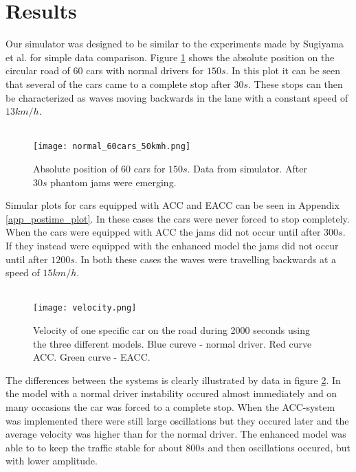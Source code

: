 \section{Results}
Our simulator was designed to be similar to the experiments made by Sugiyama
et al.\cite{sugiyama} for simple data comparison. Figure \ref{normal_postime}
shows the absolute position on the circular road of 60 cars with
normal drivers for $ 150 \unit{s} $. In this plot it can be seen that several
of the cars came to a complete stop after $ 30 \unit{s} $. These stops can
then be characterized as waves \cite{mit} moving backwards in the
lane with a constant speed of $ 13 \unit{km/h} $.\\\\

\begin{figure}[H]
    \begin{center}
    \texttt{[image: normal\_60cars\_50kmh.png]}
    \caption{\label{normal_postime}
Absolute position of 60 cars for $ 150 \unit{s} $. Data from simulator. After
$ 30 \unit{s} $ phantom jams were emerging.}
    \end{center}
\end{figure}

Simular plots for cars equipped with ACC and EACC can be seen in
Appendix \ref{app_postime_plot}. In these cases the cars were never forced to
stop completely. When the cars were equipped with ACC the jams did not occur
until after $ 300 \unit{s} $. If they instead were equipped with the enhanced
model the jams did not occur until after $ 1200 \unit{s} $. In both these
cases the waves were travelling backwards at a speed of $ 15 \unit{km/h} $.\\\\

\begin{figure}[h!]
    \begin{center}
    \texttt{[image: velocity.png]}
    \caption{\label{velocity}Velocity of one specific car on the road during
2000 seconds using the three different models. Blue cureve - normal driver. Red
curve ACC. Green curve - EACC.}
    \end{center}
\end{figure}

The differences between the systems is clearly illustrated by data in figure
\ref{velocity}. In the model with a normal driver instability occured almost
immediately and on many occasions the car was forced to a complete stop. When
the ACC-system was implemented there were still large oscillations but
they occured later and the average velocity was higher than for the normal
driver. The enhanced model was able to to keep the traffic stable for about $
800 \unit{s} $ and then oscillations occured, but with lower amplitude.

